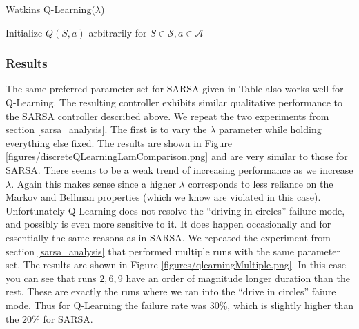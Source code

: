 \documentclass{article}
\begin{document}
\begin{algorithm}[H]
   \caption{Watkins Q-Learning($\lambda$)}
   \label{alg:Q-Learning}
\begin{algorithmic}
   \STATE Initialize $Q(S,a)$ arbitrarily for $S \in \mathcal{S}, a \in \mathcal{A}$
   \REPEAT

\end{algorithmic}
\end{algorithm}


\subsubsection{Results}

The same preferred parameter set for SARSA given in Table  also works well for Q-Learning. The resulting controller exhibits similar qualitative performance to the SARSA controller described above. We repeat the two experiments from section \ref{sarsa_analysis}. The first is to vary the $\lambda$ parameter while holding everything else fixed. The results are shown in Figure \ref{figures/discreteQLearningLamComparison.png} and are very similar to those for SARSA. There seems to be a weak trend of increasing performance as we increase $\lambda$. Again this makes sense since a higher $\lambda$ corresponds to less reliance on the Markov and Bellman properties (which we know are violated in this case). Unfortunately Q-Learning does not resolve the ``driving in circles'' failure mode, and possibly is even more sensitive to it. It does happen occasionally and for essentially the same reasons as in SARSA. We repeated the experiment from section \ref{sarsa_analysis} that performed multiple runs with the same parameter set. The results are shown in Figure \ref{figures/qlearningMultiple.png}. In this case you can see that runs $2,6,9$ have an order of magnitude longer duration than the rest. These are exactly the runs where we ran into the ``drive in circles'' faiure mode. Thus for Q-Learning the failure rate was $30\%$, which is slightly higher than the $20\%$ for SARSA.
\end{document}
